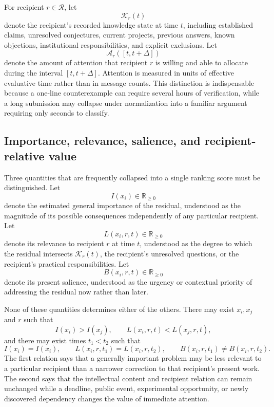 \documentclass[11pt]{article}
\theoremstyle{definition}
\newcommand{\K}{\mathcal{K}}
\newcommand{\A}{\mathcal{A}}
\begin{document}
For recipient \(r\in\mathcal{R}\), let
\[
\K_r(t)
\]
denote the recipient's recorded knowledge state at time \(t\), including established claims, unresolved conjectures, current projects, previous answers, known objections, institutional responsibilities, and explicit exclusions. Let
\[
\A_r([t,t+\Delta])
\]
denote the amount of attention that recipient \(r\) is willing and able to allocate during the interval \([t,t+\Delta]\). Attention is measured in units of effective evaluative time rather than in message counts. This distinction is indispensable because a one-line counterexample can require several hours of verification, while a long submission may collapse under normalization into a familiar argument requiring only seconds to classify.

\subsection{Importance, relevance, salience, and recipient-relative value}

Three quantities that are frequently collapsed into a single ranking score must be distinguished. Let
\[
I(x_i)\in\mathbb{R}_{\geq 0}
\]
denote the estimated general importance of the residual, understood as the magnitude of its possible consequences independently of any particular recipient. Let
\[
L(x_i,r,t)\in\mathbb{R}_{\geq 0}
\]
denote its relevance to recipient \(r\) at time \(t\), understood as the degree to which the residual intersects \(\K_r(t)\), the recipient's unresolved questions, or the recipient's practical responsibilities. Let
\[
B(x_i,r,t)\in\mathbb{R}_{\geq 0}
\]
denote its present salience, understood as the urgency or contextual priority of addressing the residual now rather than later.

None of these quantities determines either of the others. There may exist \(x_i,x_j\) and \(r\) such that
\[
I(x_i)>I(x_j),
\qquad
L(x_i,r,t)<L(x_j,r,t),
\]
and there may exist times \(t_1<t_2\) such that
\[
I(x_i)=I(x_i),
\qquad
L(x_i,r,t_1)=L(x_i,r,t_2),
\qquad
B(x_i,r,t_1)\neq B(x_i,r,t_2).
\]
The first relation says that a generally important problem may be less relevant to a particular recipient than a narrower correction to that recipient's present work. The second says that the intellectual content and recipient relation can remain unchanged while a deadline, public event, experimental opportunity, or newly discovered dependency changes the value of immediate attention.
\end{document}
